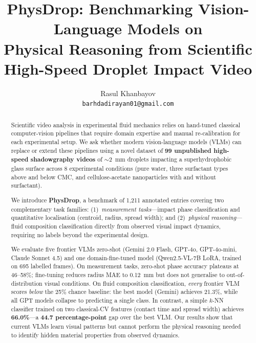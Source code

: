 \documentclass[10pt,twocolumn,letterpaper]{article}
\title{PhysDrop: Benchmarking Vision-Language Models on\\
Physical Reasoning from Scientific High-Speed Droplet Impact Video}
\author{Rasul Khanbayov\\
{\tt\small barhdadirayan01@gmail.com}
}
\begin{document}
\maketitle

\begin{abstract}
Scientific video analysis in experimental fluid mechanics relies on
hand-tuned classical computer-vision pipelines that require domain expertise
and manual re-calibration for each experimental setup.
We ask whether modern vision-language models (VLMs) can replace or
extend these pipelines using a novel dataset of \textbf{99 unpublished
high-speed shadowgraphy videos} of $\sim$\SI{2}{mm} droplets impacting a
superhydrophobic glass surface across 8 experimental conditions (pure water,
three surfactant types above and below CMC, and cellulose-acetate
nanoparticles with and without surfactant).

We introduce \textbf{PhysDrop}, a benchmark of 1{,}211 annotated entries
covering two complementary task families: (1)~\emph{measurement tasks}—impact
phase classification and quantitative localisation (centroid, radius, spread
width); and (2)~\emph{physical reasoning}—fluid composition classification
directly from observed visual impact dynamics, requiring no labels beyond the
experimental design.

We evaluate five frontier VLMs zero-shot (Gemini 2.0 Flash, GPT-4o, GPT-4o-mini,
Claude Sonnet 4.5) and one domain-fine-tuned model (Qwen2.5-VL-7B LoRA,
trained on 695 labelled frames).
On measurement tasks, zero-shot phase accuracy plateaus at 46–58\%;
fine-tuning reduces radius MAE to \SI{0.12}{mm} but does not generalise to
out-of-distribution visual conditions.
On fluid composition classification,
\textit{every} frontier VLM scores \textit{below} the 25\% chance baseline:
the best model (Gemini) achieves 21.3\%, while all GPT models collapse to
predicting a single class.
In contrast, a simple $k$-NN classifier trained on two classical-CV features
(contact time and spread width) achieves \textbf{66.0\%}—a \textbf{44.7
percentage-point} gap over the best VLM.
Our results show that current VLMs learn visual patterns but cannot perform
the physical reasoning needed to identify hidden material properties from
observed dynamics.
\end{abstract}

\end{document}
